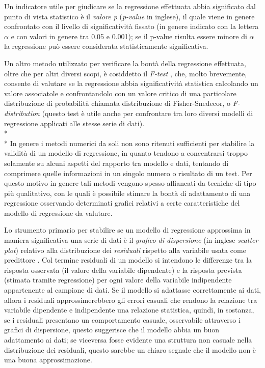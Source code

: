 \documentclass[12pt,a4paper,openright,twoside]{report}
\begin{document}
Un indicatore utile per giudicare se la regressione effettuata abbia significato dal punto di vista statistico è il  \emph{valore p} (\emph{p-value} in inglese), il quale viene in genere confrontato con il livello di significatività fissato (in genere indicato con la lettera $\alpha$ e con valori in genere tra 0.05 e 0.001); se il p-value risulta essere minore di $\alpha$ la regressione può essere considerata statisticamente significativa.

Un altro metodo utilizzato per verificare la bontà della regressione effettuata, oltre che per altri diversi scopi, è cosiddetto il \emph{F-test} \cite{fisher1925,box1953}, che, molto brevemente, consente di valutare se la regressione abbia significatività statistica calcolando un valore associatole e confrontandolo con un valore critico di una particolare distribuzione di probabilità chiamata  distribuzione di Fisher-Snedecor, o \emph{F-distribution} (questo test è utile anche per confrontare tra loro diversi modelli di regressione applicati alle stesse serie di dati).\\*\\*
In genere i metodi numerici da soli non sono ritenuti sufficienti per stabilire la validità di un modello di regressione, in quanto tendono a concentrarsi troppo solamente su alcuni aspetti del rapporto tra modello e dati, tentando di comprimere quelle informazioni in un singolo numero o risultato di un test. Per questo motivo in genere  tali metodi vengono spesso affiancati da tecniche di tipo più qualitativo, con le quali è possibile stimare la bontà di adattamento di una regressione osservando determinati grafici relativi a certe caratteristiche del modello di regressione da valutare.

Lo strumento primario per stabilire se un modello di regressione approssima in maniera significativa una serie di dati è il \emph{grafico di dispersione} (in inglese \emph{scatter-plot}) relativo alla distribuzione dei \emph{residuali} rispetto alla variabile usata come predittore \cite{nistSemantech}. Col termine residuali di un modello si intendono le differenze
tra la risposta osservata (il valore della variabile dipendente) e la risposta prevista (stimata tramite regressione) per ogni valore della variabile indipendente appartenente al campione di dati. Se il modello si adattasse correttamente ai dati, allora i residuali approssimerebbero gli errori casuali che rendono la relazione tra variabile dipendente e indipendente una relazione statistica, quindi, in sostanza, se i residuali presentano un comportamento casuale, osservabile attraverso i grafici di dispersione, questo suggerisce che il modello abbia un buon adattamento ai dati; se viceversa fosse evidente una struttura non casuale nella distribuzione dei residuali, questo sarebbe un chiaro segnale che il modello non è una buona approssimazione.
\end{document}
